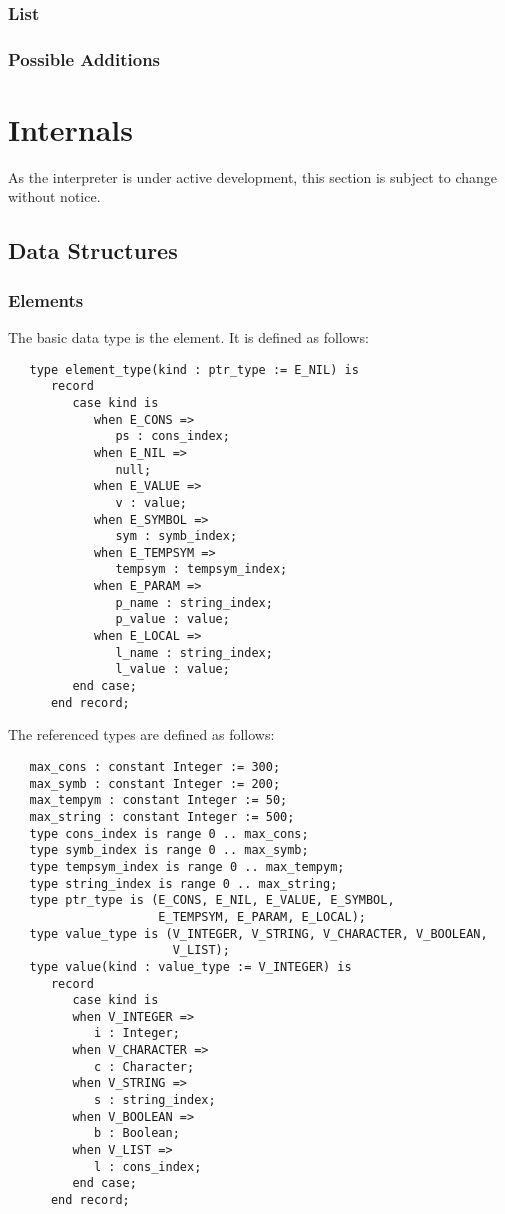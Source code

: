 \documentclass[10pt, openany]{book}
\begin{document}
\subsection{List}

\subsection{Possible Additions}

\chapter{Internals}
As the interpreter is under active development, this section is subject to change without notice.
\section{Data Structures}
\subsection{Elements}
The basic data type is the element.  It is defined as follows:
\lstset{language=Ada}
\begin{lstlisting}
   type element_type(kind : ptr_type := E_NIL) is
      record
         case kind is
            when E_CONS =>
               ps : cons_index;
            when E_NIL =>
               null;
            when E_VALUE =>
               v : value;
            when E_SYMBOL =>
               sym : symb_index;
            when E_TEMPSYM =>
               tempsym : tempsym_index;
            when E_PARAM =>
               p_name : string_index;
               p_value : value;
            when E_LOCAL =>
               l_name : string_index;
               l_value : value;
         end case;
      end record;
\end{lstlisting}
The referenced types are defined as follows:
\begin{lstlisting}
   max_cons : constant Integer := 300;
   max_symb : constant Integer := 200;
   max_tempym : constant Integer := 50;
   max_string : constant Integer := 500;
   type cons_index is range 0 .. max_cons;
   type symb_index is range 0 .. max_symb;
   type tempsym_index is range 0 .. max_tempym;
   type string_index is range 0 .. max_string;
   type ptr_type is (E_CONS, E_NIL, E_VALUE, E_SYMBOL,
                     E_TEMPSYM, E_PARAM, E_LOCAL);
   type value_type is (V_INTEGER, V_STRING, V_CHARACTER, V_BOOLEAN,
                       V_LIST);
   type value(kind : value_type := V_INTEGER) is
      record
         case kind is
         when V_INTEGER =>
            i : Integer;
         when V_CHARACTER =>
            c : Character;
         when V_STRING =>
            s : string_index;
         when V_BOOLEAN =>
            b : Boolean;
         when V_LIST =>
            l : cons_index;
         end case;
      end record;
\end{lstlisting}
\end{document}
